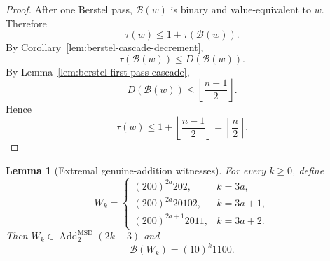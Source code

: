 \documentclass[11pt,letterpaper]{article}
\numberwithin{equation}{section}
\theoremstyle{plain}
\newtheorem{lemma}[theorem]{Lemma}
\theoremstyle{definition}
\theoremstyle{remark}
\newcommand{\AddTwo}{\operatorname{Add}_{2}}
\newcommand{\Berstel}{\mathcal{B}}
\begin{document}
\begin{proof}
After one Berstel pass, $\Berstel(w)$ is binary and value-equivalent to $w$.
Therefore
\[
\tau(w)\le 1+\tau(\Berstel(w)).
\]
By Corollary~\ref{lem:berstel-cascade-decrement},
\[
\tau(\Berstel(w))\le D(\Berstel(w)).
\]
By Lemma~\ref{lem:berstel-first-pass-cascade},
\[
D(\Berstel(w))\le \left\lfloor\frac{n-1}{2}\right\rfloor.
\]
Hence
\[
\tau(w)
\le
1+\left\lfloor\frac{n-1}{2}\right\rfloor
=
\left\lceil\frac n2\right\rceil .
\]
\end{proof}

\begin{lemma}[Extremal genuine-addition witnesses]\label{lem:berstel-depth-witnesses}
For every $k\ge 0$, define
\[
W_k=
\begin{cases}
(200)^{2a}202,&k=3a,\\
(200)^{2a}20102,&k=3a+1,\\
(200)^{2a+1}2011,&k=3a+2.
\end{cases}
\]
Then $W_k\in\AddTwo^{\mathrm{MSD}}(2k+3)$ and
\[
\Berstel(W_k)=(10)^k1100.
\]
\end{lemma}
\end{document}
